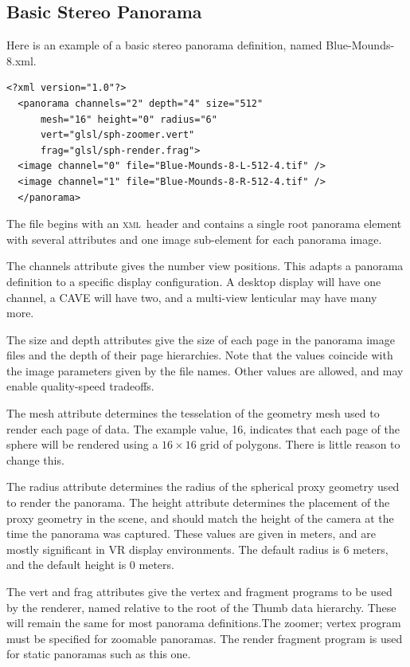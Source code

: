 \documentclass[oneside,10pt]{memoir}
\newcommand{\xml}     {\textsc{xml}}
\begin{document}
\begin{Spacing}{1.1}
\subsection{Basic Stereo Panorama}

Here is an example of a basic stereo panorama definition, named Blue-Mounds-8.xml.

\begin{Verbatim}
<?xml version="1.0"?>
  <panorama channels="2" depth="4" size="512"
      mesh="16" height="0" radius="6"
      vert="glsl/sph-zoomer.vert"
      frag="glsl/sph-render.frag">
  <image channel="0" file="Blue-Mounds-8-L-512-4.tif" />
  <image channel="1" file="Blue-Mounds-8-R-512-4.tif" />
  </panorama>
\end{Verbatim}

The file begins with an \xml\ header and contains a single root panorama element with several attributes and one image sub-element for each panorama image.

The channels attribute gives the number view positions. This adapts a panorama definition to a specific display configuration. A desktop display will have one channel, a CAVE will have two, and a multi-view lenticular may have many more.

The size and depth attributes give the size of each page in the panorama image files and the depth of their page hierarchies. Note that the values coincide with the image parameters given by the file names. Other values are allowed, and may enable quality-speed tradeoffs.

The mesh attribute determines the tesselation of the geometry mesh used to render each page of data. The example value, 16, indicates that each page of the sphere will be rendered using a $16\times 16$ grid of polygons. There is little reason to change this.

The radius attribute determines the radius of the spherical proxy geometry used to render the panorama. The height attribute determines the placement of the proxy geometry in the scene, and should match the height of the camera at the time the panorama was captured. These values are given in meters, and are mostly significant in VR display environments. The default radius is 6 meters, and the default height is 0 meters.

The vert and frag attributes give the vertex and fragment programs to be used by the renderer, named relative to the root of the Thumb data hierarchy. These will remain the same for most panorama definitions.The zoomer; vertex program must be specified for zoomable panoramas. The render fragment program is used for static panoramas such as this one.


\end{Spacing}
\end{document}
